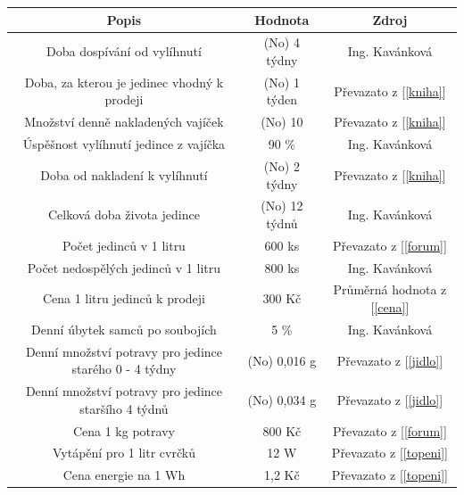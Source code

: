 \documentclass[11pt, a4paper, titlepage]{article}
\begin{document}
    \begin{table}[H]
        \begin{tabular}{|c|c|c|}

            \hline
            \textbf{Popis}                                         & \textbf{Hodnota}      & \textbf{Zdroj}                        \\ \hline
            Doba dospívání od vylíhnutí & (No) 4 týdny & Ing. Kavánková                   \\ \hline
            Doba, za kterou je jedinec vhodný k prodeji & (No) 1 týden & Převazato z [\ref{kniha}]             \\ \hline
            Množství denně nakladených vajíček & (No) 10 & Převazato z [\ref{kniha}]             \\ \hline
            Úspěšnost vylíhnutí jedince z vajíčka & 90 \%                 & Ing. Kavánková                   \\ \hline
            Doba od nakladení k vylíhnutí & (No) 2 týdny & Převazato z [\ref{kniha}]             \\ \hline
            Celková doba života jedince & (No) 12 týdnů & Ing. Kavánková                   \\ \hline
            Počet jedinců v 1 litru & 600 ks & Převazato z [\ref{forum}]             \\ \hline
            Počet nedospělých jedinců v 1 litru & 800 ks & Ing. Kavánková              \\ \hline
            Cena 1 litru jedinců k prodeji & 300 Kč & Průměrná hodnota z [\ref{cena}]       \\ \hline
            Denní úbytek samců po soubojích & 5 \%                  & Ing. Kavánková                   \\ \hline
            Denní množství potravy pro jedince starého 0 - 4 týdny & (No) 0,016 g & Převazato z [\ref{jidlo}]             \\ \hline
            Denní množství potravy pro jedince staršího 4 týdnů & (No) 0,034 g & Převazato z [\ref{jidlo}]             \\ \hline
            Cena 1 kg potravy & 800 Kč & Převazato z [\ref{forum}]             \\ \hline
            Vytápění pro 1 litr cvrčků & 12 W & Převazato z [\ref{topeni}]            \\ \hline
            Cena energie na 1 Wh & 1,2 Kč & Převazato z [\ref{topeni}]            \\ \hline
        \end{tabular}
    \end{table}
\end{document}
